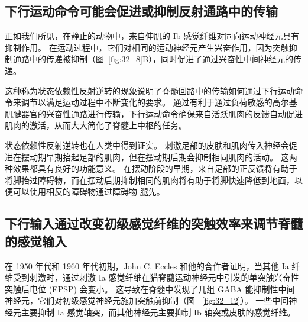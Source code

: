 \subsection{下行运动命令可能会促进或抑制反射通路中的传输}

正如我们所见，在静止的动物中，来自伸肌的 Ib 感觉纤维对同向运动神经元具有抑制作用。
在运动过程中，它们对相同的运动神经元产生兴奋作用，因为突触抑制通路中的传递被抑制（图~\ref{fig:32_8}B），同时促进了通过兴奋性中间神经元的传递。


这种称为状态依赖性反射逆转的现象说明了脊髓回路中的传输如何通过下行运动命令来调节以满足运动过程中不断变化的要求。
通过有利于通过负荷敏感的高尔基肌腱器官的兴奋性通路进行传输，下行运动命令确保来自活跃肌肉的反馈自动促进肌肉的激活，从而大大简化了脊髓上中枢的任务。


状态依赖性反射逆转也在人类中得到证实。
刺激足部的皮肤和肌肉传入神经会促进在摆动期早期抬起足部的肌肉，但在摆动期后期会抑制相同肌肉的活动。
这两种效果都具有良好的功能意义。
在摆动阶段的早期，来自足部的正反馈将有助于将脚抬过障碍物，而在摆动后期抑制相同的肌肉将有助于将脚快速降低到地面，以便可以使用相反的障碍物通过障碍物 腿先。



\subsection{下行输入通过改变初级感觉纤维的突触效率来调节脊髓的感觉输入}

在 1950 年代和 1960 年代初期，John C. Eccles 和他的合作者证明，当其他 Ia 纤维受到刺激时，通过刺激 Ia 感觉纤维在猫脊髓运动神经元中引发的单突触兴奋性突触后电位 (EPSP) 会变小。
这导致在脊髓中发现了几组 GABA 能抑制性中间神经元，它们对初级感觉神经元施加突触前抑制（图 ~\ref{fig:32_12}）。 
一些中间神经元主要抑制 Ia 感觉轴突，而其他神经元主要抑制 Ib 轴突或皮肤的感觉纤维。


